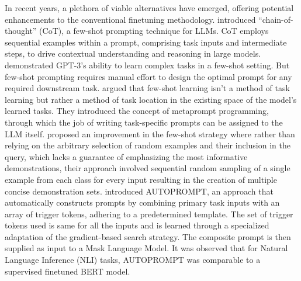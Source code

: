 In recent years, a plethora of viable alternatives have emerged, offering potential enhancements to the conventional finetuning methodology.
\cite{wei2022chain} introduced ``chain-of-thought'' (CoT), a few-shot prompting technique for LLMs. CoT employs sequential examples within a prompt, comprising task inputs and intermediate steps, to drive contextual understanding and reasoning in large models. \cite{brown2020language} demonstrated GPT-3's ability to learn complex tasks in a few-shot setting.
But few-shot prompting requires manual effort to design the optimal prompt for any required downstream task. \cite{reynolds2021prompt} argued that few-shot learning isn't a method of task learning but rather a method of task location in the existing space of the model's learned tasks. They introduced the concept of metaprompt programming, through which the job of writing task-specific prompts can be assigned to the LLM itself. \cite{gao2020making} proposed an improvement in the few-shot strategy where rather than relying on the arbitrary selection of random examples and their inclusion in the query, which lacks a guarantee of emphasizing the most informative demonstrations, their approach involved sequential random sampling of a single example from each class for every input resulting in the creation of multiple concise demonstration sets. \cite{shin2020autoprompt} introduced AUTOPROMPT, an approach that automatically constructs prompts by combining primary task inputs with an array of trigger tokens, adhering to a predetermined template. The set of trigger tokens used is same for all the inputs and is learned through a specialized adaptation of the gradient-based search strategy. The composite prompt is then supplied as input to a Mask Language Model. It was observed that for Natural Language Inference (NLI) tasks, AUTOPROMPT was comparable to a supervised finetuned BERT model.

